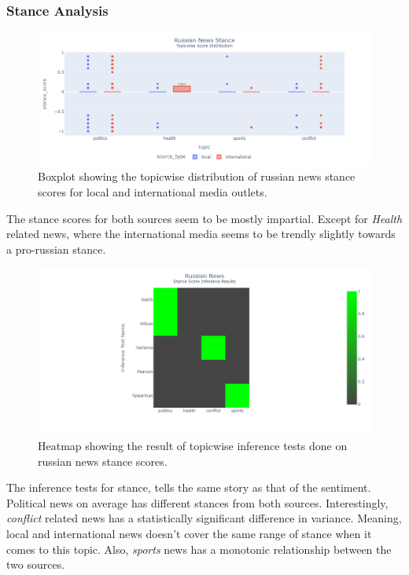 \documentclass{article}
\theoremstyle{mytheoremstyle}
\theoremstyle{mytheoremstyle}
\theoremstyle{myproblemstyle}
\begin{document}
    \subsubsection{Stance Analysis}
    
    \begin{figure}[hp]
        \centering
        \includegraphics[width=\linewidth]{../images/plots/Russia/russia_boxplot_stance.png}
        \caption{Boxplot showing the topicwise distribution of russian news stance scores for local and international media outlets.}
        \label{fig:russia_stance_score_boxplot}
    \end{figure} 

    The stance scores for both sources seem to be mostly impartial. Except for \emph{Health} related news, where the international media seems to be trendly slightly towards a pro-russian stance.

    \begin{figure}[hp]
        \centering
        \includegraphics[width=\linewidth]{../images/plots/Russia/russia_heatmap_inference_stance.png}
        \caption{Heatmap showing the result of topicwise inference tests done on russian news stance scores.}
        \label{fig:russia_stance_score_heatmap}
    \end{figure}

    The inference tests for stance, tells the same story as that of the sentiment. Political news on average has different stances from both sources. Interestingly, \emph{conflict} related news has a statistically significant difference in variance. Meaning, local and international news doesn't cover the same range of stance when it comes to this topic. Also, \emph{sports} news has a monotonic relationship between the two sources.
\end{document}
